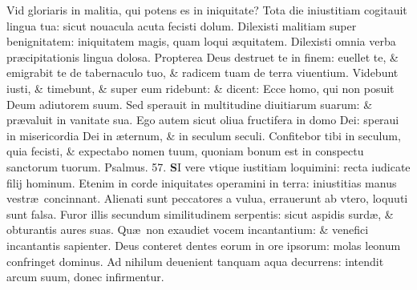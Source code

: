 \documentclass[a5paper,10pt]{book}
\def\ae{æ}
\begin{document}
\begin{multicols*}{2}
Vid gloriaris in malitia, qui potens es in iniquitate?
\newline \color{red} T\color{black}ota die iniustitiam cogitauit lingua tua: sicut nouacula acuta fecisti dolum.
\newline \color{red} D\color{black}ilexisti malitiam super benignitatem: iniquitatem magis, quam loqui \ae quitatem.
\newline \color{red} D\color{black}ilexisti omnia verba pr\ae cipitationis lingua dolosa.
\newline \color{red} P\color{black}ropterea Deus destruet te in finem: euellet te, \& emigrabit te de tabernaculo tuo, \& radicem tuam de terra viuentium.
\newline \color{red} V\color{black}idebunt iusti, \& timebunt, \& super eum ridebunt: \& dicent: Ecce homo, qui non posuit Deum adiutorem suum.
\newline \color{red} S\color{black}ed sperauit in multitudine diuitiarum suarum: \& pr\ae valuit in vanitate sua.
\newline \color{red} E\color{black}go autem sicut oliua fructifera in domo Dei: speraui in misericordia Dei in \ae ternum, \& in seculum seculi.
\newline \color{red} C\color{black}onfitebor tibi in seculum, quia fecisti, \& expectabo nomen tuum, quoniam bonum est in conspectu sanctorum tuorum. \quad \color{red} Psalmus. \hypertarget{ps57}{57.} \color{black}
\lettrine[lines=2]{\bfseries \color{red} S}{}I vere vtique iustitiam loquimini: recta iudicate filij hominum.
\newline \color{red} E\color{black}tenim in corde iniquitates operamini in terra: iniustitias manus vestr\ae \ concinnant.
\newline \color{red} A\color{black}lienati sunt peccatores a vulua, errauerunt ab vtero, loquuti sunt falsa.
\newline \color{red} F\color{black}uror illis secundum similitudinem serpentis: sicut aspidis surd\ae , \& obturantis aures suas.
\newline \color{red} Q\color{black}u\ae \ non exaudiet vocem incantantium: \& venefici incantantis sapienter.
\newline \color{red} D\color{black}eus conteret dentes eorum in ore ipsorum: molas leonum confringet dominus.
\newline \color{red} A\color{black}d nihilum deuenient tanquam aqua decurrens: intendit arcum suum, donec infirmentur.

\end{multicols*}
\end{document}

